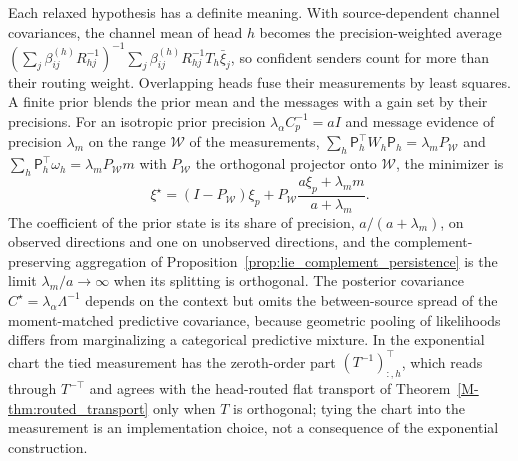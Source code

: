 \documentclass[twoside,11pt]{article}
\begin{document}
Each relaxed hypothesis has a definite meaning. With source-dependent channel covariances, the channel mean of head $h$ becomes the precision-weighted average $(\sum_j\beta_{ij}^{(h)}R_{hj}^{-1})^{-1}\sum_j\beta_{ij}^{(h)}R_{hj}^{-1}T_h\bar\xi_j$, so confident senders count for more than their routing weight. Overlapping heads fuse their measurements by least squares. A finite prior blends the prior mean and the messages with a gain set by their precisions. For an isotropic prior precision $\lambda_\alpha C_p^{-1}=aI$ and message evidence of precision $\lambda_m$ on the range $\mathcal W$ of the measurements, $\sum_h\mathsf P_h^\top W_h\mathsf P_h=\lambda_mP_{\mathcal W}$ and $\sum_h\mathsf P_h^\top\omega_h=\lambda_mP_{\mathcal W}m$ with $P_{\mathcal W}$ the orthogonal projector onto $\mathcal W$, the minimizer is
\begin{equation}
\xi^\star=(I-P_{\mathcal W})\xi_p+P_{\mathcal W}\frac{a\xi_p+\lambda_m m}{a+\lambda_m}.
\label{eq:rec_fusion_residual}
\end{equation}
The coefficient of the prior state is its share of precision, $a/(a+\lambda_m)$, on observed directions and one on unobserved directions, and the complement-preserving aggregation of Proposition~\ref{prop:lie_complement_persistence} is the limit $\lambda_m/a\to\infty$ when its splitting is orthogonal. The posterior covariance $C^\star=\lambda_\alpha\Lambda^{-1}$ depends on the context but omits the between-source spread of the moment-matched predictive covariance, because geometric pooling of likelihoods differs from marginalizing a categorical predictive mixture. In the exponential chart the tied measurement has the zeroth-order part $(T^{-1})_{:,h}^\top$, which reads through $T^{-\top}$ and agrees with the head-routed flat transport of Theorem~\ref{M-thm:routed_transport} only when $T$ is orthogonal; tying the chart into the measurement is an implementation choice, not a consequence of the exponential construction.
\end{document}
